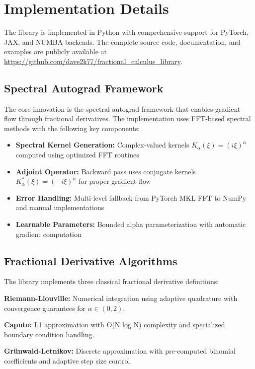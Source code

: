 \section{Implementation Details}

The \hpfracc library is implemented in Python with comprehensive support for PyTorch, JAX, and NUMBA backends. The complete source code, documentation, and examples are publicly available at \url{https://github.com/dave2k77/fractional_calculus_library}.

\subsection{Spectral Autograd Framework}

The core innovation is the spectral autograd framework that enables gradient flow through fractional derivatives. The implementation uses FFT-based spectral methods with the following key components:

\begin{itemize}
    \item \textbf{Spectral Kernel Generation:} Complex-valued kernels $K_\alpha(\xi) = (i\xi)^\alpha$ computed using optimized FFT routines
    \item \textbf{Adjoint Operator:} Backward pass uses conjugate kernels $K_\alpha^*(\xi) = (-i\xi)^\alpha$ for proper gradient flow
    \item \textbf{Error Handling:} Multi-level fallback from PyTorch MKL FFT to NumPy and manual implementations
    \item \textbf{Learnable Parameters:} Bounded alpha parameterization with automatic gradient computation
\end{itemize}

\subsection{Fractional Derivative Algorithms}

The library implements three classical fractional derivative definitions:

\textbf{Riemann-Liouville:} Numerical integration using adaptive quadrature with convergence guarantees for $\alpha \in (0,2)$.

\textbf{Caputo:} L1 approximation with O(N log N) complexity and specialized boundary condition handling.

\textbf{Grünwald-Letnikov:} Discrete approximation with pre-computed binomial coefficients and adaptive step size control.

